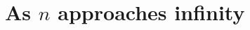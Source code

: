 \documentclass[12pt]{scrippsthesis}
\newcommand{\mchoose}[2]{{\textstyle \left( \! {#1 \choose #2} \! \right)}}
\theoremstyle{definition}
\newtheorem{dfn}{Definition}[section]
\theoremstyle{remark}
\theoremstyle{plain}
\begin{document}
%
%
%
%
%
%
%
%
%	
%
%
%
%
%
%
%
%
%
%
%

\section{ As $n$ approaches infinity }
\end{document}
